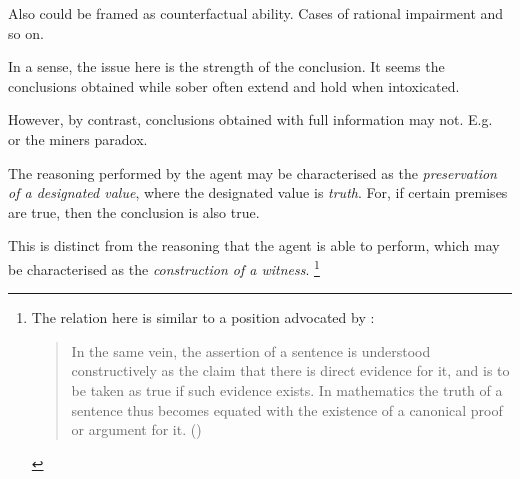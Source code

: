 \documentclass[10pt]{article}
\begin{document}
\begin{note}[Counterfactual]
Also could be framed as counterfactual ability.
Cases of rational impairment and so on.

In a sense, the issue here is the strength of the conclusion.
It seems the conclusions obtained while sober often extend and hold when intoxicated.

However, by contrast, conclusions obtained with full information may not.
E.g.\ \cite{Smith:2004aa} or the miners paradox.
\end{note}


\begin{note}

  The reasoning performed by the agent may be characterised as the \emph{preservation of a designated value}, where the designated value is \emph{truth}.
  For, if certain premises are true, then the conclusion is also true.

  This is distinct from the reasoning that the agent is able to perform, which may be characterised as the \emph{construction of a witness}.\nolinebreak
  \footnote{
    The relation here is similar to a position advocated by \citeauthor{Prawitz:2005aa}:
    \begin{quote}
      In the same vein, the assertion of a sentence is understood constructively as the claim that there is direct evidence for it, and is to be taken as true if such evidence exists.
      In mathematics the truth of a sentence thus becomes equated with the existence of a canonical proof or argument for it.\nolinebreak
      \mbox{}\hfill\mbox{(\citeauthor[692]{Prawitz:2005aa})}
    \end{quote}

}
\end{note}
\end{document}
